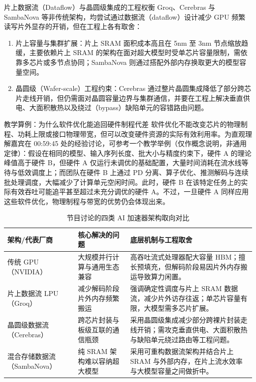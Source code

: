 \documentclass[UTF8,a4paper,11pt,fontset=fandol]{ctexart}
\begin{document}
\begin{importantbox}{片上数据流（Dataflow）与晶圆级集成的工程权衡}
Groq、Cerebras 与 SambaNova 等非传统架构，均尝试通过数据流（dataflow）设计减少 GPU 频繁读写片外显存的开销，但在工程上各有取舍：
\begin{enumerate}
\item 片上容量与集群扩展：片上 SRAM 面积成本高且在 5nm 至 3nm 节点缩放趋缓，主要依赖片上 SRAM 的架构在面对超大模型时受单芯片容量限制，需依靠多芯片或多节点协同；SambaNova 则通过搭配外部内存换取更大的模型容量空间。
\item 晶圆级（Wafer-scale）工程约束：Cerebras 通过整片晶圆集成降低了部分跨芯片走线开销，但仍需面对晶圆容量边界与集群通信，并要在工程上解决垂直供电、大面积散热以及绕过（bypass）缺陷单元的容错路由问题。
\end{enumerate}
\end{importantbox}
\begin{knowledgebox}{教学算例：为什么软件优化能追回硬件制程代差}
软件优化不能改变芯片的物理制程、功耗上限或接口物理带宽，但可以改变硬件资源的实际有效利用率。为直观理解嘉宾在 00:59:45 处的经验讨论，可参考一个教学举例（仅作概念说明，非通用定律）：假设在相同的模型、输入序列长度、批大小与精度约束下，硬件 A 的理论峰值高于硬件 B，但硬件 A 仅运行未调优的基础配置，大量时间消耗在流水线等待与低效调度上；而团队在硬件 B 上通过 PD 分离、算子优化、推测解码与连续批处理调度，大幅减少了计算单元空闲时间。此时，硬件 B 在该特定任务上的实际有效吞吐可能追平甚至超过未充分调优的硬件 A。不过，一旦硬件 A 同样应用这些软件优化，物理制程与带宽的优势仍会体现出来。
\end{knowledgebox}
\begin{table}[H]\centering\small
\caption{节目讨论的四类 AI 加速器架构取向对比}
\begin{tabular}{>{\raggedright\arraybackslash}p{\dimexpr(\linewidth-6\tabcolsep)/3\relax}>{\raggedright\arraybackslash}p{\dimexpr(\linewidth-6\tabcolsep)/3\relax}>{\raggedright\arraybackslash}p{\dimexpr(\linewidth-6\tabcolsep)/3\relax}}
\toprule
架构/代表厂商 & 核心解决的问题 & 底层机制与工程取舍\\\midrule
传统 GPU（NVIDIA） & 大规模并行计算与通用生态兼容 & 高吞吐流式处理器配大容量 HBM；擅长预填充，但解码阶段易因片外内存搬运导致算力闲置。\\[4pt]
片上数据流 LPU（Groq） & 减少解码阶段片外内存频繁搬运 & 强调确定性调度与片上 SRAM 数据流，减少片外访存往返；单芯片容量有限，大模型需多芯片扩展。\\[4pt]
晶圆级数据流（Cerebras） & 跨芯片封装与板级互联的通信瓶颈 & 采用晶圆级集成减少部分跨裸片封装走线开销；需攻克垂直供电、大面积散热与缺陷单元绕过路由等工程问题。\\[4pt]
混合存储数据流（SambaNova） & 纯 SRAM 架构难以容纳超大模型 & 采用可重构数据流架构并结合片上 SRAM 与外部内存，在片上流水效率与大模型容量之间做折中。\\[4pt]
\bottomrule\end{tabular}\end{table}
\end{document}
